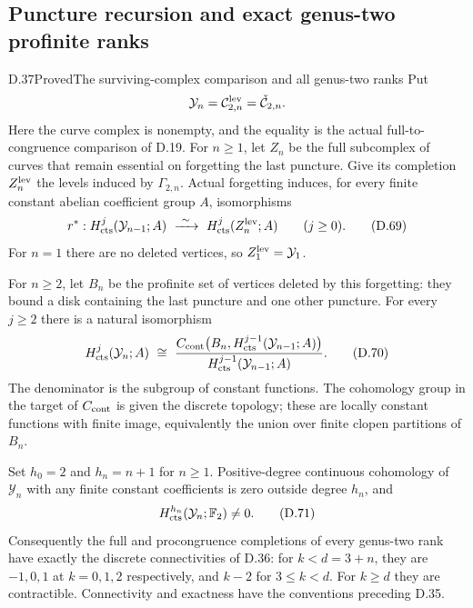 \subsection{Puncture recursion and exact genus-two profinite ranks}

\begin{result}{D.37}{Proved}{The surviving-complex comparison and all genus-two ranks}
Put
\[
 \mathcal Y_n=\mathcal C_{2,n}^{\rm lev}
              =\check{\mathcal C}_{2,n}.
\]
Here the curve complex is nonempty, and the equality is the actual
full-to-congruence comparison of D.19.  For $n\geq1$, let $Z_n$
be the full subcomplex of curves that remain essential on forgetting
the last puncture.  Give its completion $Z_n^{\rm lev}$ the levels
induced by $\Gamma_{2,n}$.  Actual forgetting induces, for every
finite constant abelian coefficient group $A$, isomorphisms
\[
 r^*:H^j_{\rm cts}(\mathcal Y_{n-1};A)
       \ \xrightarrow{\ \sim\ }\
       H^j_{\rm cts}(Z_n^{\rm lev};A)
       \qquad(j\geq0).                                      \tag{D.69}
\]
For $n=1$ there are no deleted vertices, so
$Z_1^{\rm lev}=\mathcal Y_1$.

For $n\geq2$, let $B_n$ be the profinite set of vertices deleted
by this forgetting: they bound a disk containing the last puncture
and one other puncture.  For every $j\geq2$ there is a natural
isomorphism
\[
 H^j_{\rm cts}(\mathcal Y_n;A)
   \ \cong\
 \frac{C_{\rm cont}\bigl(B_n,
             H^{j-1}_{\rm cts}(\mathcal Y_{n-1};A)\bigr)}
      {H^{j-1}_{\rm cts}(\mathcal Y_{n-1};A)}.                 \tag{D.70}
\]
The denominator is the subgroup of constant functions.
The cohomology group in the target of $C_{\rm cont}$ is given the
discrete topology; these are locally constant functions with finite
image, equivalently the union over finite clopen partitions of
$B_n$.

Set $h_0=2$ and $h_n=n+1$ for $n\geq1$.  Positive-degree
continuous cohomology of $\mathcal Y_n$ with any finite constant
coefficients is zero outside degree $h_n$, and
\[
       H^{h_n}_{\rm cts}(\mathcal Y_n;\mathbb F_2)\ne0 .
                                                               \tag{D.71}
\]
Consequently the full and procongruence completions of every
genus-two rank have exactly the discrete connectivities of D.36:
for $k<d=3+n$, they are $-1,0,1$ at $k=0,1,2$ respectively,
and $k-2$ for $3\leq k<d$.  For $k\geq d$ they are contractible.
Connectivity and exactness have the conventions preceding D.35.
\end{result}
